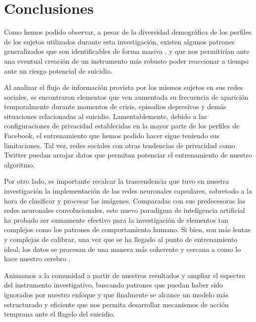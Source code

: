 \documentclass[12pt, man, donotrepeattitle, letterpaper]{apa6}
\begin{document}
    \section{Conclusiones}
    Como hemos podido observar, a pesar de la diversidad demográfica de los perfiles de los sujetos utilizados durante esta investigación, existen algunos patrones generalizados que son identificables de forma masiva \parencite{Twitter}, y que nos permitirían ante una eventual creación de un instrumento más robusto poder reaccionar a tiempo ante un riesgo potencial de suicidio.
    
    Al analizar el flujo de información provista por los mismos sujetos en sus redes sociales, se encontraron elementos que ven aumentada su frecuencia de aparición temporalmente durante momentos de crisis, episodios depresivos y demás situaciones relacionadas al suicidio. Lamentablemente, debido a las configuraciones de privacidad establecidas en la mayor parte de los perfiles de Facebook, el entrenamiento que hemos podido hacer sigue teniendo sus limitaciones. Tal vez, redes sociales con otras tendencias de privacidad como Twitter puedan arrojar datos que permitan potenciar el entrenamiento de nuestro algoritmo.
    
    Por otro lado, es importante recalcar la trascendencia que tuvo en nuestra investigación la implementación de las redes neuronales capsulares, sobretodo a la hora de clasificar y procesar las imágenes. Comparadas con sus predecesoras las redes neuronales convolucionales, este nuevo paradigma de inteligencia artificial ha probado ser sumamente efectivo para la investigación de elementos tan complejos como los patrones de comportamiento humano. Si bien, son más lentas y complejas de calibrar, una vez que se ha llegado al punto de entrenamiento ideal, los datos se procesan de una manera más coherente y cercana a como lo hace nuestro cerebro \parencite{Convolutional}.
    
    Animamos a la comunidad a partir de nuestros resultados y ampliar el espectro del instrumento investigativo, buscando patrones que puedan haber sido ignorados por nuestro enfoque y que finalmente se alcance un modelo más estructurado y eficiente que nos permita desarrollar mecanismos de acción temprana ante el flagelo del suicidio.
    \printbibliography
    
\end{document}
